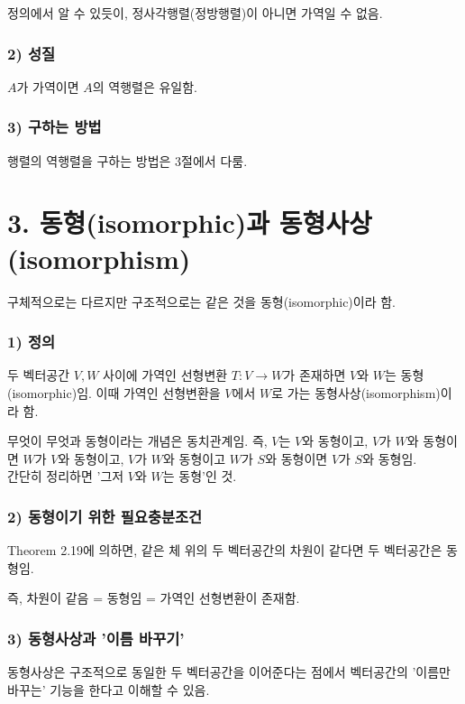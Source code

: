 정의에서 알 수 있듯이, 정사각행렬(정방행렬)이 아니면 가역일 수 없음.

\subsubsection*{2) 성질}
$A$가 가역이면 $A$의 역행렬은 유일함.

\subsubsection*{3) 구하는 방법}

행렬의 역행렬을 구하는 방법은 3절에서 다룸.


\newpage


\section*{3. 동형(isomorphic)과 동형사상(isomorphism)}
구체적으로는 다르지만 구조적으로는 같은 것을 동형(isomorphic)이라 함.

\subsubsection*{1) 정의\\}
\begin{DEF}
두 벡터공간 $V,W$ 사이에 가역인 선형변환 $T:V \rightarrow W$가 존재하면 $V$와 $W$는 동형(isomorphic)임. 이때 가역인 선형변환을 $V$에서 $W$로 가는 동형사상(isomorphism)이라 함.
\end{DEF}

무엇이 무엇과 동형이라는 개념은 동치관계임. 즉, $V$는 $V$와 동형이고, $V$가 $W$와 동형이면 $W$가 $V$와 동형이고, $V$가 $W$와 동형이고 $W$가 $S$와 동형이면 $V$가 $S$와 동형임.\\
간단히 정리하면 '그저 $V$와 $W$는 동형'인 것.

\subsubsection*{2) 동형이기 위한 필요충분조건}
Theorem 2.19에 의하면, 같은 체 위의 두 벡터공간의 차원이 같다면 두 벡터공간은 동형임.

즉, 차원이 같음 = 동형임 = 가역인 선형변환이 존재함.

\subsubsection*{3) 동형사상과 '이름 바꾸기'}
동형사상은 구조적으로 동일한 두 벡터공간을 이어준다는 점에서 벡터공간의 '이름만 바꾸는' 기능을 한다고 이해할 수 있음.

